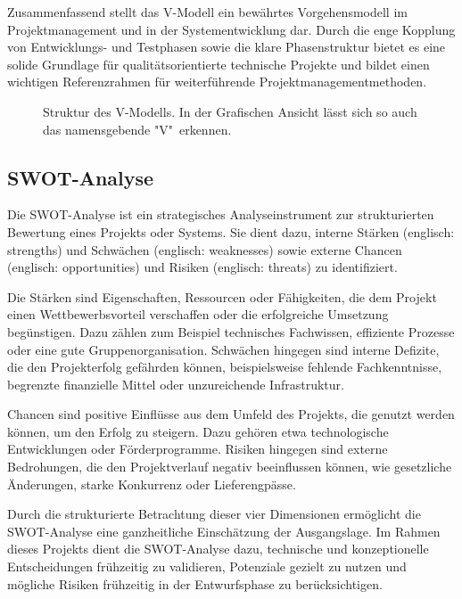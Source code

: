 Zusammenfassend stellt das V-Modell ein bewährtes Vorgehensmodell im Projektmanagement und in der Systementwicklung dar. Durch die enge Kopplung von Entwicklungs- und Testphasen sowie die klare Phasenstruktur bietet es eine solide Grundlage für qualitätsorientierte technische Projekte und bildet einen wichtigen Referenzrahmen für weiterführende Projektmanagementmethoden.

\vspace{0.5cm}
\begin{figure}[hbt]
	\centering
	
	\vspace{0.5cm}
	\caption{Struktur des V-Modells. In der Grafischen Ansicht lässt sich so auch das namensgebende "V"\ erkennen.}		
	\label{fig:V_Modell}
\end{figure}

\subsection{SWOT-Analyse}
\label{cha:SWOT-Analyse}

Die SWOT-Analyse ist ein strategisches Analyseinstrument zur strukturierten Bewertung eines Projekts oder Systems. Sie dient dazu, interne Stärken (englisch: strengths) und Schwächen (englisch: weaknesses) sowie externe Chancen (englisch: opportunities) und Risiken (englisch: threats) zu identifiziert.

Die Stärken sind Eigenschaften, Ressourcen oder Fähigkeiten, die dem Projekt einen Wettbewerbsvorteil verschaffen oder die erfolgreiche Umsetzung begünstigen. Dazu zählen zum Beispiel technisches Fachwissen, effiziente Prozesse oder eine gute Gruppenorganisation. Schwächen hingegen sind interne Defizite, die den Projekterfolg gefährden können, beispielsweise fehlende Fachkenntnisse, begrenzte finanzielle Mittel oder unzureichende Infrastruktur.

Chancen sind positive Einflüsse aus dem Umfeld des Projekts, die genutzt werden können, um den Erfolg zu steigern. Dazu gehören etwa technologische Entwicklungen oder Förderprogramme. Risiken hingegen sind externe Bedrohungen, die den Projektverlauf negativ beeinflussen können, wie gesetzliche Änderungen, starke Konkurrenz oder Lieferengpässe. \autocite{SWOT.2024}

Durch die strukturierte Betrachtung dieser vier Dimensionen ermöglicht die SWOT-Analyse eine ganzheitliche Einschätzung der Ausgangslage. Im Rahmen dieses Projekts dient die SWOT-Analyse dazu, technische und konzeptionelle Entscheidungen frühzeitig zu validieren, Potenziale gezielt zu nutzen und mögliche Risiken frühzeitig in der Entwurfsphase zu berücksichtigen.


